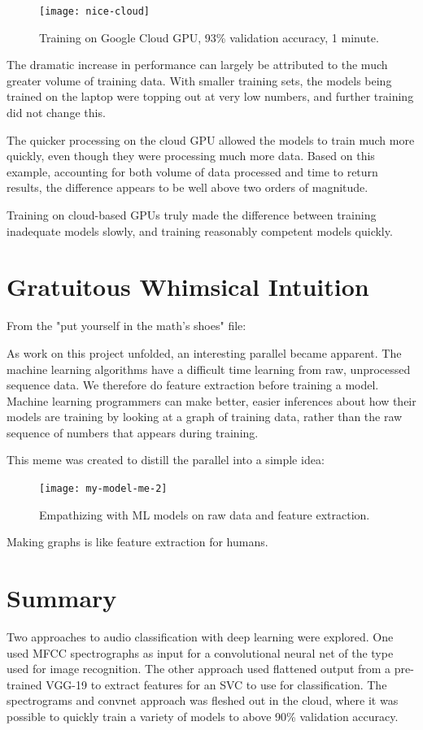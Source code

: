 \documentclass[sigconf]{acmart}
\begin{document}
\begin{figure}[h]
  \centering
  \texttt{[image: nice-cloud]}
  \caption{Training on Google Cloud GPU, 93\% validation accuracy, 1 minute.}
\end{figure}

The dramatic increase in performance can largely be attributed to the much greater volume of
training data. With smaller training sets, the models being trained on the laptop were topping
out at very low numbers, and further training did not change this.

The quicker processing on the cloud GPU allowed the models to train much more quickly, even
though they were processing much more data. 
Based on this example, accounting for both volume of data processed and time to return
results, the difference appears to be well above two orders of magnitude.

Training on cloud-based GPUs truly made the difference between training 
inadequate models slowly, and training reasonably competent models quickly.

\section{Gratuitous Whimsical Intuition}

From the "put yourself in the math's shoes" file:

As work on this project unfolded, an interesting parallel became apparent.
The machine learning algorithms have a difficult time learning from raw, unprocessed
sequence data. We therefore do feature extraction before training a model. Machine
learning programmers can make better, easier inferences about how their models 
are training by looking at a graph of training data, rather than the raw sequence of
numbers that appears during training.

This meme was created to distill the parallel into a simple idea:

\begin{figure}[h]
  \centering
  \texttt{[image: my-model-me-2]}
  \caption{Empathizing with ML models on raw data and feature extraction.}
\end{figure}

Making graphs is like feature extraction for humans.



\section{Summary}
Two approaches to audio classification with deep learning were explored. One used
MFCC spectrographs as input for a convolutional neural net of the type used for image recognition.
The other approach used flattened output from a pre-trained VGG-19 to extract
features for an SVC to use for classification. The spectrograms and convnet approach
was fleshed out in the cloud, where it was possible to quickly train a variety of models
to above 90\% validation accuracy. 
\end{document}

